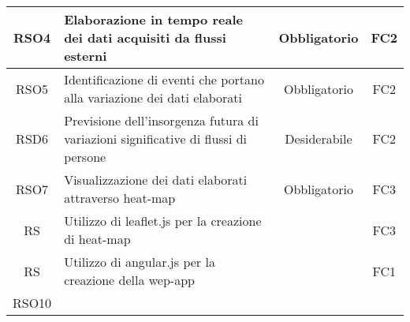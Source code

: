 {\begin{center}
\begin{tabularx}{\textwidth}{ |c|X|c|c| }
			\hline
			RSO4 & Elaborazione in tempo reale dei dati acquisiti da flussi esterni & Obbligatorio & FC2  \\
			\hline
			RSO5 & Identificazione di eventi che portano alla variazione dei dati elaborati & Obbligatorio & FC2  \\
			\hline
			RSD6 & Previsione dell'insorgenza futura di variazioni significative di flussi di persone & Desiderabile & FC2  \\
			\hline
			RSO7 & Visualizzazione dei dati elaborati attraverso heat-map & Obbligatorio & FC3  \\
			\hline
			RS  & Utilizzo di leaflet.js per la creazione di heat-map &  & FC3 \\
			\hline
			RS  & Utilizzo di angular.js per la creazione della wep-app  &  & FC1 \\
			
			
			\hline
			RSO10 &  & & \\
	\end{tabularx}
	\end{center}








}
